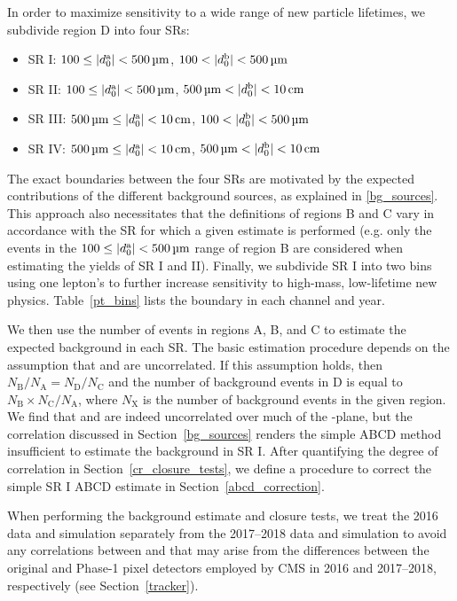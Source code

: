 In order to maximize sensitivity to a wide range of new particle lifetimes, we subdivide region D into four SRs:
\begin{itemize}
    \itemsep0em
    \item SR I:   $\num{100}\leq\ada<\SI{500}{\um}$, $\num{100} < \adb<\SI{500}{\um}$
    \item SR II:  $\num{100}\leq\ada<\SI{500}{\um}$, $\SI{500}{\um}<\adb<\SI{10}{\cm}$
    \item SR III: $\SI{500}{\um} \leq \ada<\SI{10}{\cm}$, $\num{100} < \adb<\SI{500}{\um}$
    \item SR IV:  $\SI{500}{\um} \leq \ada<\SI{10}{\cm}$, $\SI{500}{\um}<\adb<\SI{10}{\cm}$
\end{itemize}
The exact boundaries between the four SRs are motivated by the expected contributions of the different background sources, as explained in \ref{bg_sources}. This approach also necessitates that the definitions of regions B and C vary in accordance with the SR for which a given estimate is performed (e.g. only the events in the $\num{100}\leq\ada<\SI{500}{\um}$ range of region B are considered when estimating the yields of SR I and II). Finally, we subdivide SR I into two bins using one lepton's \pt to further increase sensitivity to high-mass, low-lifetime new physics. Table~\ref{pt_bins} lists the \pt boundary in each channel and year.



We then use the number of events in regions A, B, and C to estimate the expected background in each SR. The basic estimation procedure depends on the assumption that \ada and \adb are uncorrelated. If this assumption holds, then $N_{\text{B}}/N_{\text{A}}=N_{\text{D}}/N_{\text{C}}$ and the number of background events in D is equal to $N_{\text{B}}\times N_{\text{C}}/N_{\text{A}}$, where $N_{\text{X}}$ is the number of background events in the given region. We find that \ada and \adb are indeed uncorrelated over much of the \ad-\ad plane, but the correlation discussed in Section~\ref{bg_sources} renders the simple ABCD method insufficient to estimate the background in SR I. After quantifying the degree of correlation in Section~\ref{cr_closure_tests}, we define a procedure to correct the simple SR I ABCD estimate in Section~\ref{abcd_correction}.

When performing the background estimate and closure tests, we treat the 2016 data and simulation separately from the 2017--2018 data and simulation to avoid any correlations between \ada and \adb that may arise from the differences between the original and Phase-1 pixel detectors employed by CMS in 2016 and 2017--2018, respectively (see Section~\ref{tracker}).

